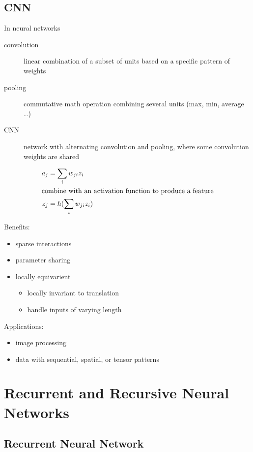 \documentclass[]{article}
\theoremstyle{definition}
\begin{document}
\subsection{CNN}
\label{sub:cnn}

In neural networks
\begin{description}
    \item[convolution] linear combination of a subset of units based on a specific pattern of weights 
    \item[pooling] commutative math operation combining several units (max, min, average \ldots)
    \item[CNN] network with alternating convolution and pooling, where some convolution weights are shared
\end{description}
\begin{align*}
    a_j &= \sum_i w_{ji} z_i \\
    \intertext{combine with an activation function to produce a feature}
    z_j &= h(\sum_i w_{ji}z_i)
\end{align*}


\medskip

Benefits:
\begin{itemize}
    \item sparse interactions
    \item parameter sharing
    \item locally equivarient
        \begin{itemize}
            \item locally invariant to translation
            \item handle inputs of varying length
        \end{itemize}
\end{itemize}

Applications:
\begin{itemize}
    \item image processing
    \item data with sequential, spatial, or tensor patterns
\end{itemize}

\section{Recurrent and Recursive Neural Networks}
\label{sec:recurrent_and_recursive_neural_networks}

\subsection{Recurrent Neural Network}
\label{sub:recurrent_neural_network}
\end{document}
